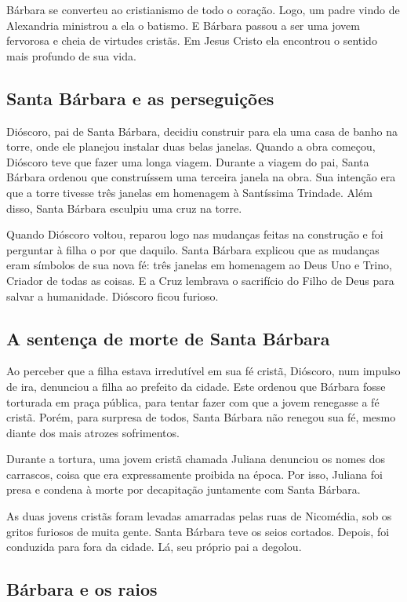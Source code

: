 \documentclass[11pt]{article}
\begin{document}
\begin{justify}
Bárbara se converteu ao cristianismo de todo o coração. Logo, um padre vindo de Alexandria ministrou a ela o batismo. E Bárbara passou a ser uma jovem fervorosa e cheia de virtudes cristãs. Em Jesus Cristo ela encontrou o sentido mais profundo de sua vida.

\subsection{Santa Bárbara e as perseguições}

Dióscoro, pai de Santa Bárbara, decidiu construir para ela uma casa de banho na torre, onde ele planejou instalar duas belas janelas. Quando a obra começou, Dióscoro teve que fazer uma longa viagem. Durante a viagem do pai, Santa Bárbara ordenou que construíssem uma terceira janela na obra. Sua intenção era que a torre tivesse três janelas em homenagem à Santíssima Trindade. Além disso, Santa Bárbara esculpiu uma cruz na torre.

Quando Dióscoro voltou, reparou logo nas mudanças feitas na construção e foi perguntar à filha o por que daquilo. Santa Bárbara explicou que as mudanças eram símbolos de sua nova fé: três janelas em homenagem ao Deus Uno e Trino, Criador de todas as coisas. E a Cruz lembrava o sacrifício do Filho de Deus para salvar a humanidade. Dióscoro ficou furioso.

\subsection{A sentença de morte de Santa Bárbara}

Ao perceber que a filha estava irredutível em sua fé cristã, Dióscoro, num impulso de ira, denunciou a filha ao prefeito da cidade. Este ordenou que Bárbara fosse torturada em praça pública, para tentar fazer com que a jovem renegasse a fé cristã. Porém, para surpresa de todos, Santa Bárbara não renegou sua fé, mesmo diante dos mais atrozes sofrimentos.

Durante a tortura, uma jovem cristã chamada Juliana denunciou os nomes dos carrascos, coisa que era expressamente proibida na época. Por isso, Juliana foi presa e condena à morte por decapitação juntamente com Santa Bárbara.

As duas jovens cristãs foram levadas amarradas pelas ruas de Nicomédia, sob os gritos furiosos de muita gente. Santa Bárbara teve os seios cortados. Depois, foi conduzida para fora da cidade. Lá, seu próprio pai a degolou.

\subsection{Bárbara e os raios}


\end{justify}
\end{document}

